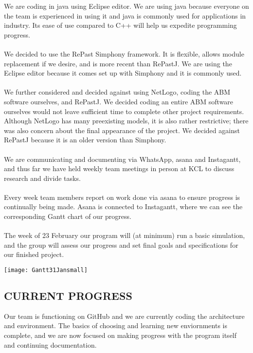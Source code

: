 \documentclass[11pt]{article}
\begin{document}
We are coding in java using Eclipse editor. We are using java because everyone 
on the team is experienced in using it and java is commonly used for applications in industry. 
Its ease of use compared to C++ will help us expedite programming progress.
\\ \\
We decided to use the RePast Simphony framework. It is flexible, allows 
module replacement if we desire, and is more recent than RePastJ. We are using the Eclipse 
editor because it comes set up with Simphony and it is commonly used.
\\ \\
We further considered and decided against using NetLogo, coding the ABM software ourselves, and RePastJ. 
We decided coding an entire ABM software ourselves would not leave sufficient time to 
complete other project requirements. Although NetLogo has many preexisting models, it is 
also rather restrictive; there was also concern about the final appearance of the project.
We decided against RePastJ because it is an older version than Simphony.
\\ \\
We are communicating and documenting via WhatsApp, asana and Instagantt, and thus 
far we have held weekly team meetings in person at KCL to discuss research and divide tasks.
\\ \\
Every week team members report on work done via asana to ensure progress is continually 
being made. Asana is connected to Instagantt, where we can see the corresponding Gantt
chart of our progress.
\\ \\
The week of 23 February our program will (at minimum) run a basic simulation, and the 
group will assess our progress and set final goals and specifications for our finished 
project.

 
\texttt{[image: Gantt31Jansmall]}



\subsection*{CURRENT PROGRESS}

Our team is functioning on GitHub and we are currently coding the architecture and 
environment. The basics of choosing and learning new enviornments is complete, and we
are now focused on making progress with the program itself and continuing documentation.
 
\end{document}
